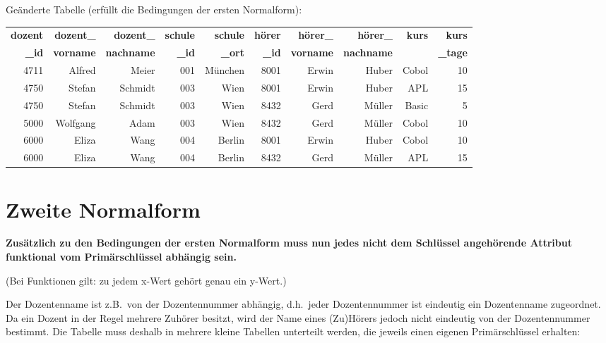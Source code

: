 \begin{minipage}{1.0\textwidth}
Geänderte Tabelle (erfüllt die Bedingungen der ersten Normalform):

\begin{center}
\begin{tabular}{|r|r|r|r|r|r|r|r|r|r|}\hline
\textbf{dozent} & \textbf{dozent\_} & \textbf{dozent\_} & \textbf{schule} &
\textbf{schule} & \textbf{hörer} & \textbf{hörer\_} & \textbf{hörer\_} &
\textbf{kurs} & \textbf{kurs}\\
\textbf{\_id} & \textbf{vorname} & \textbf{nachname} & \textbf{\_id} &
\textbf{\_ort} & \textbf{\_id}  & \textbf{vorname} & \textbf{nachname}
& & \textbf{\_tage}\\
\hline
4711 & Alfred & Meier & 001 & München & 8001 & Erwin & Huber & Cobol & 10\\
\hline 
4750 & Stefan & Schmidt & 003 & Wien & 8001 & Erwin & Huber & APL & 15\\ 
\hline
4750 & Stefan & Schmidt & 003 & Wien & 8432 & Gerd & Müller & Basic & 5\\ 
\hline 
5000 & Wolfgang & Adam & 003 & Wien & 8432 & Gerd & Müller & Cobol & 10\\ 
\hline
6000 & Eliza & Wang & 004 & Berlin & 8001 & Erwin & Huber & Cobol & 10\\ 
\hline
6000 & Eliza & Wang & 004 & Berlin & 8432 & Gerd & Müller & APL & 15\\ 
\hline
\end{tabular}
\end{center}
\end{minipage}

\section{Zweite Normalform}

\textbf{Zusätzlich zu den Bedingungen der ersten Normalform muss nun jedes
nicht dem Schlüssel angehörende Attribut funktional vom Primärschlüssel abhängig
sein.}

(Bei Funktionen gilt: zu jedem x-Wert gehört genau ein y-Wert.) 

Der Dozentenname ist z.B.\ von der Dozentennummer abhängig, d.h.\ jeder
Dozentennummer ist eindeutig ein Dozentenname zugeordnet. Da ein Dozent in der
Regel mehrere Zuhörer besitzt, wird der Name eines (Zu)Hörers jedoch nicht
eindeutig von der Dozentennummer bestimmt. Die Tabelle muss deshalb in mehrere
kleine Tabellen unterteilt werden, die jeweils einen eigenen Primärschlüssel
erhalten:


